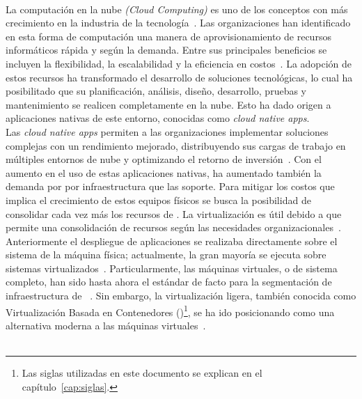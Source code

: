 \label{cap:introduccion}
\mbox{}\\
La computación en la nube \textit{(Cloud Computing)} es uno de los conceptos con más crecimiento en la industria de la tecnología~\citep{Jayaweera2024}. Las organizaciones han identificado en esta forma de computación una manera de aprovisionamiento de recursos informáticos rápida y según la demanda. Entre sus principales beneficios se incluyen la flexibilidad, la escalabilidad y la eficiencia en costos~\citep{Ahmadi2024}. La adopción de estos recursos ha transformado el desarrollo de soluciones tecnológicas, lo cual ha posibilitado que su planificación, análisis, diseño, desarrollo, pruebas y mantenimiento se realicen completamente en la nube. Esto ha dado origen a aplicaciones nativas de este entorno, conocidas como \textit{cloud native apps}.\\
Las \textit{cloud native apps} permiten a las organizaciones implementar soluciones complejas con un rendimiento mejorado, distribuyendo sus cargas de trabajo en múltiples entornos de nube y optimizando el retorno de inversión~\citep{Alonso2023}. Con el aumento en el uso de estas aplicaciones nativas, ha aumentado también la demanda por por infraestructura que las soporte. Para mitigar los costos que implica el crecimiento de estos equipos físicos se busca la posibilidad de consolidar cada vez más los recursos de \TI. La virtualización es útil debido a que permite una consolidación de recursos según las necesidades organizacionales~\citep{chebiyyam2009server}. Anteriormente el despliegue de aplicaciones se realizaba directamente sobre el sistema de la máquina física; actualmente, la gran mayoría se ejecuta sobre sistemas virtualizados~\citep{Jain2016}. Particularmente, las máquinas virtuales, o de sistema completo, han sido hasta ahora el estándar de facto para la segmentación de infraestructura de \TI\ \citep{lorenxo2021}. Sin embargo, la virtualización ligera, también conocida como Virtualización Basada en Contenedores (\textbf{\VBC})\footnote{Las siglas utilizadas en este documento se explican en el capítulo~\ref{cap:siglas}.}, se ha ido posicionando como una alternativa moderna a las máquinas virtuales~\citep{raghavendra2018review}.\\ \\

